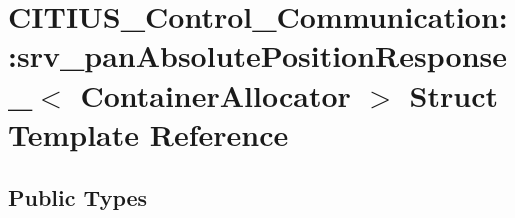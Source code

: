 \hypertarget{struct_c_i_t_i_u_s___control___communication_1_1srv__pan_absolute_position_response__}{\section{\-C\-I\-T\-I\-U\-S\-\_\-\-Control\-\_\-\-Communication\-:\-:srv\-\_\-pan\-Absolute\-Position\-Response\-\_\-$<$ \-Container\-Allocator $>$ \-Struct \-Template \-Reference}
\label{struct_c_i_t_i_u_s___control___communication_1_1srv__pan_absolute_position_response__}
}
\subsection*{\-Public \-Types}
